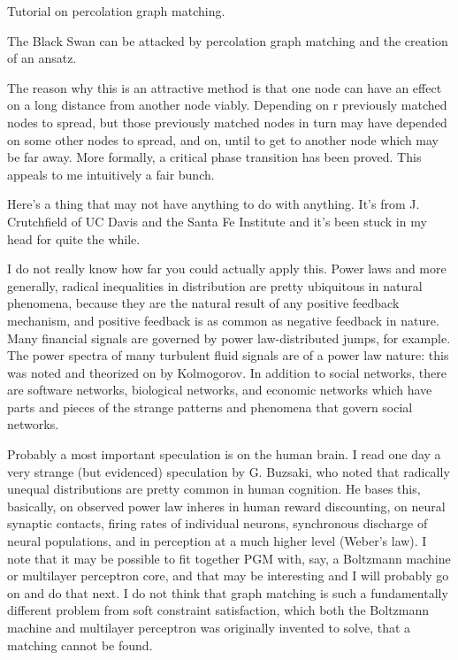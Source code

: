 \documentclass[12pt]{article}
\begin{document}
Tutorial on percolation graph matching.

The Black Swan can be attacked by percolation graph matching and the creation of an ansatz.

The reason why this is an attractive method is that one node can have an effect on a long distance from another node viably. Depending on r previously matched nodes to spread, but those previously matched nodes in turn may have depended on some other nodes to spread, and on, until to get to another node which may be far away. More formally, a critical phase transition has been proved. This appeals to me intuitively a fair bunch.

Here's a thing that may not have anything to do with anything. It's from J. Crutchfield of UC Davis and the Santa Fe Institute and it's been stuck in my head for quite the while.

I do not really know how far you could actually apply this. Power laws and more generally, radical inequalities in distribution are pretty ubiquitous in natural phenomena, because they are the natural result of any positive feedback mechanism, and positive feedback is as common as negative feedback in nature. Many financial signals are governed by power law-distributed jumps, for example. The power spectra of many turbulent fluid signals are of a power law nature: this was noted and theorized on by Kolmogorov. In addition to social networks, there are software networks, biological networks, and economic networks which have parts and pieces of the strange patterns and phenomena that govern social networks.

Probably a most important speculation is on the human brain. I read one day a very strange (but evidenced) speculation by G. Buzsaki, who noted that radically unequal distributions are pretty common in human cognition. He bases this, basically, on observed power law inheres in human reward discounting, on neural synaptic contacts, firing rates of individual neurons, synchronous discharge of neural populations, and in perception at a much higher level (Weber's law). I note that it may be possible to fit together PGM with, say, a Boltzmann machine or multilayer perceptron core, and that may be interesting and I will probably go on and do that next. I do not think that graph matching is such a fundamentally different problem from soft constraint satisfaction, which both the Boltzmann machine and multilayer perceptron was originally invented to solve, that a matching cannot be found.
\end{document}
